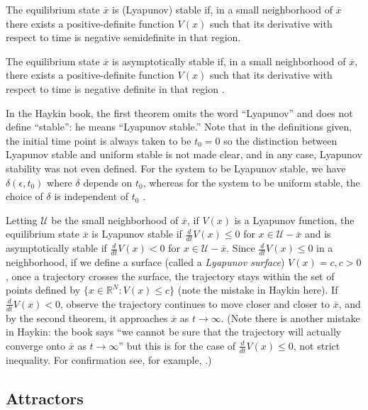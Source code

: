 \begin{theorem}
The equilibrium state $\overline{x}$ is (Lyapunov) stable if, in a small neighborhood of $\overline{x}$ there exists a positive-definite function $V(x)$ such that its derivative with respect to time is negative semidefinite in that region.
\end{theorem}

\begin{theorem}
The equilibrium state $\overline{x}$ is asymptotically stable if, in a small neighborhood of $\overline{x}$, there exists a positive-definite function $V(x)$ such that its derivative with respect to time is negative definite in that region \cite[p. 682]{Haykin:2009:NNC:1213811}.
\end{theorem}

In the Haykin book, the first theorem omits the word ``Lyapunov'' and does not define ``stable'': he means ``Lyapunov stable.'' Note that in the definitions given, the initial time point is always taken to be $t_0 = 0$ so the distinction between Lyapunov stable and uniform stable is not made clear, and in any case, Lyapunov stability was not even defined. For the system to be Lyapunov stable, we have $\delta(\epsilon, t_0)$ where $\delta$ depends on $t_0$, whereas for the system to be uniform stable, the choice of $\delta$ is independent of $t_0$ \cite{byao}.

Letting $\mathcal{U}$ be the small neighborhood of $\overline{x}$, if $V(x)$ is a Lyapunov function, the equilibrium state $\overline{x}$ is Lyapunov stable if $\frac{d}{dt} V(x) \leq 0$ for $x \in \mathcal{U} - \overline{x}$ and is asymptotically stable if $\frac{d}{dt}V(x) < 0$ for $x \in \mathcal{U} - \overline{x}$. Since $\frac{d}{dt} V(x) \leq 0$ in a neighborhood, if we define a surface (called a \emph{Lyapunov surface}) $V(x) = c, c > 0$, once a trajectory crosses the surface, the trajectory stays within the set of points defined by $\{x \in \mathbb{R}^N : V(x) \leq c\}$ (note the mistake in Haykin here). If $\frac{d}{dt}V(x) < 0$, observe the trajectory continues to move closer and closer to $\overline{x}$, and by the second theorem, it approaches $\overline{x}$ as $t \to \infty$. (Note there is another mistake in Haykin: the book says ``we cannot be sure that the trajectory will actually converge onto $\overline{x}$ as $t \to \infty$'' but this is for the case of $\frac{d}{dt} V(x) \leq 0$, not strict inequality. For confirmation see, for example, \citealt[p. 18-19]{christofides2005control}.)

\subsection{Attractors}

